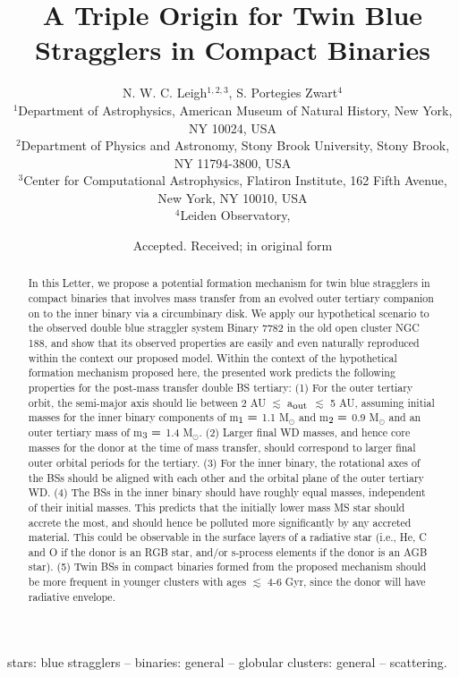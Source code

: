 \documentclass[useAMS,usenatbib]{mnras}
\title[Compact Binaries of BS Twins from Stellar Triples]{A Triple Origin for Twin Blue Stragglers in Compact Binaries}
\author[N. W. C. Leigh \& S. Portegies Zwart]{N. W. C. Leigh$^{1,2,3}$, S. Portegies Zwart$^{4}$ \\
$^{1}$Department of Astrophysics, American Museum of Natural History, New York, NY 10024, USA\\
$^{2}$Department of Physics and Astronomy, Stony Brook University, Stony Brook, NY 11794-3800, USA\\
$^{3}$Center for Computational Astrophysics, Flatiron Institute, 162 Fifth Avenue, New York, NY 10010, USA\\
$^{4}$Leiden Observatory, }
\begin{document}
\date{Accepted. Received; in original form}

\pagerange{\pageref{firstpage}--\pageref{lastpage}} 

\maketitle

\label{firstpage}

\begin{abstract}
In this Letter, we propose a potential formation mechanism for twin blue stragglers in compact binaries that involves mass transfer from an evolved outer tertiary companion on to the inner binary via a circumbinary disk.  We apply our hypothetical scenario to the observed double blue straggler system Binary 7782 in the old open cluster NGC 188, and show that its observed properties are easily and even naturally reproduced within the context our proposed model.  Within the context of the hypothetical formation mechanism proposed here, the presented work predicts the following properties for the post-mass transfer double BS tertiary:  (1)  For the outer tertiary orbit, the semi-major axis should lie between 2 AU $\lesssim$ a$_{\rm out}$ $\lesssim$ 5 AU, assuming initial masses for the inner binary components of m$_{\rm 1} =$ 1.1 M$_{\odot}$ and m$_{\rm 2} =$ 0.9 M$_{\odot}$ and an outer tertiary mass of m$_{\rm 3} =$ 1.4 M$_{\odot}$. (2)  Larger final WD masses, and hence core masses for the donor at the time of mass transfer, should correspond to larger final outer orbital periods for the tertiary. (3)  For the inner binary, the rotational axes of the BSs should be aligned with each other and the orbital plane of the outer tertiary WD. (4)  The BSs in the inner binary should have roughly equal masses, independent of their initial masses.  This predicts that the initially lower mass MS star should accrete the most, and should hence be polluted more significantly by any accreted material.  This could be observable in the surface layers of a radiative star (i.e., He, C and O if the donor is an RGB star, and/or s-process elements if the donor is an AGB star). (5) Twin BSs in compact binaries formed from the proposed mechanism should be more frequent in younger clusters with ages $\lesssim$ 4-6 Gyr, since the donor will have  radiative envelope.

\end{abstract}

\begin{keywords}
stars: blue stragglers -- binaries: general -- globular clusters: general -- scattering. 
\end{keywords}
\end{document}
